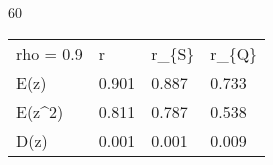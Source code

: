 
60
\begin{tabular}{llll}
\hline
 rho = 0.9 & r     & r\_\{S\} & r\_\{Q\} \\
 E(z)      & 0.901 & 0.887 & 0.733 \\
 E(z\^{}2)    & 0.811 & 0.787 & 0.538 \\
 D(z)      & 0.001 & 0.001 & 0.009 \\
\hline
\end{tabular}